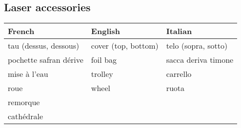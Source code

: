 \documentclass[a4paper, 12pt, twoside]{article}
\begin{document}
    \begin{indt}{\section{Laser accessories}} %
        \begin{tabular}{|l|l|l|}
            \hline %
            \textbf{French}
            & \textbf{English}
            & \textbf{Italian}
            \\
            \hline
            \hline %
            tau (dessus, dessous) %
            & cover (top, bottom)
            & telo (sopra, sotto)
            \\
            \hline %
            pochette safran dérive %
            & foil bag
            & sacca deriva timone
            \\
            \hline %
            mise à l'eau %
            & trolley
            & carrello
            \\
            \hline %
            roue %
            & wheel
            & ruota
            \\
            \hline %
            remorque %
            &
            &
            \\
            \hline %
            cathédrale %
            &
            &
            \\
            \hline %
        \end{tabular}
    \end{indt} %
\end{document}
